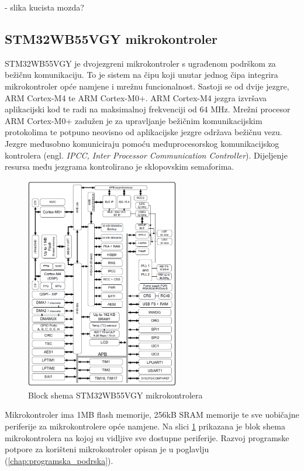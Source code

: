 \documentclass[../diplomski_rad.tex]{subfiles}
\begin{document}
- slika kucista mozda?

\subsection{STM32WB55VGY mikrokontroler}

STM32WB55VGY je dvojezgreni mikrokontroler s ugrađenom podrškom za bežičnu komunikaciju. 
To je sistem na čipu koji unutar jednog čipa integrira mikrokontroler opće namjene i mrežnu funcionalnost. 
Sastoji se od dvije jezgre, ARM Cortex-M4 te ARM Cortex-M0+.  
ARM Cortex-M4 jezgra izvršava aplikacijski kod te radi na maksimalnoj frekvenciji od 64 MHz. 
Mrežni procesor ARM Cortex-M0+ zadužen je za upravljanje bežičnim komunikacijskim protokolima 
te potpuno neovisno od aplikacijske jezgre održava bežičnu vezu.
Jezgre međusobno komuniciraju pomoću međuprocesorskog komunikacijskog kontrolera (engl. \textit{IPCC,  Inter Processor
Communication Controller}). 
Dijeljenje resursa među jezgrama kontrolirano je sklopovskim semaforima.

\begin{figure}[htb!]
    \centering
    \includegraphics[width=0.6\textwidth]{Figures/stm32mikro.png} 
    \caption{Block shema STM32WB55VGY mikrokontrolera \cite{stm32mikro}}
    \label{slk:stm32mikro}
\end{figure}

Mikrokontroler ima 1MB flash memorije, 256kB SRAM memorije te sve uobičajne periferije za mikrokontrolere opće namjene. 
Na slici \ref{slk:stm32mikro} prikazana je blok shema mikrokontrolera na kojoj su vidljive sve dostupne periferije.
Razvoj programske potpore za korišteni mikrokontroler opisan je u poglavlju (\ref{chap:programska_podrska}).
\end{document}
